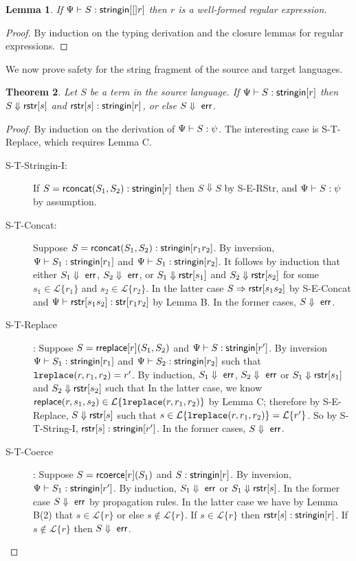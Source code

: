 \documentclass{acm_proc_article-sp}
\newtheorem{thm}{Theorem}
\newtheorem{lem}[thm]{Lemma}
\theoremstyle{definition}
\newcommand{\Lagr}{\mathcal{L}}
\newcommand{\lang}[1]{\Lagr\{#1\}}
\newcommand{\reduces}{ \Rightarrow }
\newcommand{\coerce}[2]{ {\sf rcoerce}[#1](#2)}
\newcommand{\rsconcat}[2]{{\sf rconcat}(#1,#2)}
\newcommand{\stringin}[1]{{\sf stringin}[#1]}
\renewcommand{\tstr}[1]{{{\sf str}[#1]}}
\newcommand{\lsubst}[3]{{\tt lreplace}(#1,#2,#3)}
\newcommand{\err}{\ {\sf err}}
\newcommand{\treduces}{ \Downarrow }
\newcommand{\sreduces}{ \Downarrow }
\begin{document}
\begin{lem}
  If $\sctx \vdash S : \stringin[r]$ then $r$ is a well-formed regular expression. 
\end{lem}
\begin{proof}
  By induction on the typing derivation and the closure lemmas for regular
  expressions.
\end{proof}


We now prove safety for the string fragment of the source and target languages.

\begin{thm}
  Let $S$ be a term in the source language. If $\sctx \vdash S : \stringin{r}$ 
  then $S \sreduces \rstr{s}$ and $\rstr{s} : \stringin{r}$, or else $S \sreduces \err$.
\end{thm}
\begin{proof}
By induction on the derivation of $\Psi \vdash S : \psi$. The interesting case
is S-T-Replace, which requires Lemma C.

\begin{description}
\item[S-T-Stringin-I:]
If $S = \rsconcat{S_1}{S_2} : \stringin{r}$ then
$S \treduces S$ by S-E-RStr, and $\Psi \vdash S : \psi$ by assumption.

\item[S-T-Concat:] 
Suppose $S = \rsconcat{S_1}{S_2} : \stringin{r_1 r_2}$.
By inversion, $\sctx \vdash S_1 : \stringin{r_1}$ and $\sctx \vdash S_1 : \stringin{r_2}$.
It follows by induction that either $S_1 \treduces \err$, $S_2 \treduces \err$, 
or $S_1 \treduces \rstr{s_1}$ and $S_2 \treduces \rstr{s_2}$ for some $s_1 \in \lang{r_1}$ and $s_2 \in \lang{r_2}$.
In the latter case $S \reduces \rstr{s_1s_2}$ by S-E-Concat and $\sctx \vdash \rstr{s_1s_2} : \tstr{r_1r_2}$ by Lemma B.
In the former cases, $S \sreduces \err$.

\item[S-T-Replace]:
Suppose $S = {\sf rreplace}[r](S_1,S_2)$ and $\sctx \vdash S : \stringin{r'}$.
By inversion $\sctx \vdash S_1 : \stringin{r_1}$ and $\sctx \vdash S_2 : \stringin{r_2}$ such that $\lsubst{r}{r_1}{r_2} = r'$.
By induction, $S_1 \sreduces \err$, $S_2 \sreduces \err$ 
or $S_1 \sreduces \rstr{s_1}$ and $S_2 \sreduces \rstr{s_2}$ such that 
In the latter case, we know $\metareplace{r}{s_1}{s_2} \in \lang{\lsubst{r}{r_1}{r_2}}$ by Lemma C;
therefore by S-E-Replace, $S \treduces \rstr{s}$ such that  $s \in \lang{\lsubst{r}{r_1}{r_2}} = \lang{r'}$.
So by S-T-String-I, $\rstr{s} : \stringin{r'}$.
In the former cases, $S \treduces \err$.

\item[S-T-Coerce]:
Suppose $S = \coerce{r}{S_1}$ and $S : \stringin{r}$.
By inversion, $\sctx \vdash S_1 : \stringin{r'}$.
By induction, $S_1 \treduces \err$ or $S_1 \treduces \rstr{s}$.
In the former case $S \treduces \err$ by propagation rules.
In the latter case we have by Lemma B(2) that $s \in \lang{r}$ or else
$s \not \in \lang{r}$.
If $s \in \lang{r}$ then $\rstr{s} : \stringin{r}$.
If $s \not \in \lang{r}$ then $S \treduces \err$. 
\end{description}
\end{proof}
\end{document}
